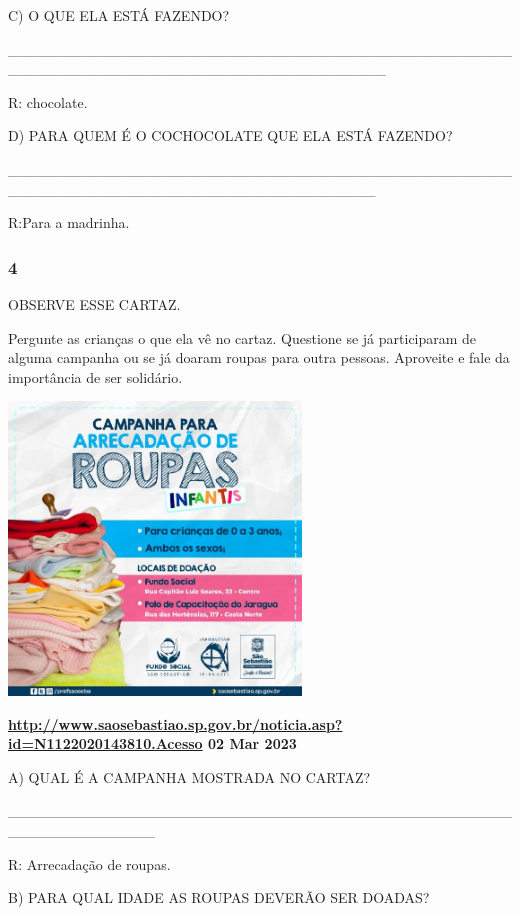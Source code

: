 C) O QUE ELA ESTÁ FAZENDO?

\_\_\_\_\_\_\_\_\_\_\_\_\_\_\_\_\_\_\_\_\_\_\_\_\_\_\_\_\_\_\_\_\_\_\_\_\_\_\_\_\_\_\_\_\_\_\_\_\_\_\_\_\_\_\_\_\_\_\_\_\_\_\_\_\_\_\_\_\_\_\_\_\_\_\_\_\_\_\_\_\_\_\_\_

R: chocolate.

D) PARA QUEM É O COCHOCOLATE QUE ELA ESTÁ FAZENDO?

\_\_\_\_\_\_\_\_\_\_\_\_\_\_\_\_\_\_\_\_\_\_\_\_\_\_\_\_\_\_\_\_\_\_\_\_\_\_\_\_\_\_\_\_\_\_\_\_\_\_\_\_\_\_\_\_\_\_\_\_\_\_\_\_\_\_\_\_\_\_\_\_\_\_\_\_\_\_\_\_\_\_\_

R:Para a madrinha.

\subsubsection{4 }\label{section-32}

OBSERVE ESSE CARTAZ.

Pergunte as crianças o que ela vê no cartaz. Questione se já
participaram de alguma campanha ou se já doaram roupas para outra
pessoas. Aproveite e fale da importância de ser solidário.

\includegraphics[width=3.06414in,height=3.07006in]{media/image83.jpeg}

\textbf{\url{http://www.saosebastiao.sp.gov.br/noticia.asp?id=N1122020143810.Acesso}
02 Mar 2023}

A) QUAL É A CAMPANHA MOSTRADA NO CARTAZ?

\_\_\_\_\_\_\_\_\_\_\_\_\_\_\_\_\_\_\_\_\_\_\_\_\_\_\_\_\_\_\_\_\_\_\_\_\_\_\_\_\_\_\_\_\_\_\_\_\_\_\_\_\_\_\_\_\_\_\_\_\_\_

R: Arrecadação de roupas.

B) PARA QUAL IDADE AS ROUPAS DEVERÃO SER DOADAS?

